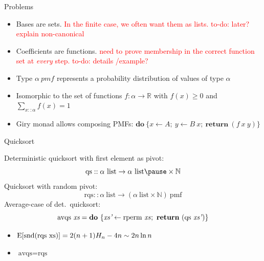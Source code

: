 \documentclass[%
	sans,
	12pt,
]{beamer}
\newcommand{\high}[1]{{\usebeamercolor[fg]{structure} #1}}
\newcommand{\bad}[1]{\textcolor{red}{#1}}
\newcommand{\expectation}{\text{\upshape E}}
\begin{document}
\begin{frame}{Problems}
\begin{itemize}
\item Bases are sets.
\bad{In the finite case, we often want them as lists. to-do: later? explain non-canonical}
\item Coefficients are functions.
\bad{need to prove membership in the correct function set at \emph{every} step.
	 to-do: details /example?}
\end{itemize}
\begin{itemize}
\item Type $\alpha\ \textit{pmf}$ represents a probability distribution of values of type $\alpha$\pause
\item Isomorphic to the set of functions $f : \alpha\to\mathbb{R}$ with $f(x) \geq 0$ and $\sum_{x :: \alpha} f(x) = 1$\pause
\item Giry monad allows composing PMFs: $\textbf{do}\ \{x\leftarrow A;\ y \leftarrow B\ x;\ \textbf{return}\ (f\ x\ y)\}$
\end{itemize}
\end{frame}

\begin{frame}
\begin{center}
\huge\high{Quicksort}
\end{center}
\end{frame}

\begin{frame}
Deterministic quicksort with first element as pivot:
\[\text{qs} :: \alpha\ \text{list} \to \alpha\ \text{list}\pause \times \mathbb{N}\]\pause
Quicksort with random pivot:
\[\text{rqs} :: \alpha\ \text{list} \to (\alpha\ \text{list} \times \mathbb{N})\ \text{pmf}\]\pause
Average-case of det.\ quicksort:
\[\text{avqs}\ \textit{xs} = \textbf{do}\ \{\textit{xs'} \leftarrow \text{rperm}\ \textit{xs}\hskip0.2mm;\ \textbf{return}\ (\text{qs}\ \textit{xs'}\hskip0.2mm)\}\]\pause
\vspace*{-1.5em}
\begin{theorem}
\upshape
\begin{itemize}
\item $\expectation[\text{snd}(\text{rqs}\ \text{xs})] = 2(n+1) H_n - 4n \sim 2 n \ln n$\pause
\item $\text{avqs} = \text{rqs}$
\end{itemize}
\end{theorem}
\end{frame}
\end{document}
